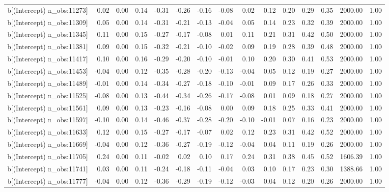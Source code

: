 \begin{table}[ht]
\begin{tabular}{rrrrrrrrrrrrrrr}
  b[(Intercept) n\_obs:11273] & 0.02 & 0.00 & 0.14 & -0.31 & -0.26 & -0.16 & -0.08 & 0.02 & 0.12 & 0.20 & 0.29 & 0.35 & 2000.00 & 1.00 \\ 
  b[(Intercept) n\_obs:11309] & 0.05 & 0.00 & 0.14 & -0.31 & -0.21 & -0.13 & -0.04 & 0.05 & 0.14 & 0.23 & 0.32 & 0.39 & 2000.00 & 1.00 \\ 
  b[(Intercept) n\_obs:11345] & 0.11 & 0.00 & 0.15 & -0.27 & -0.17 & -0.08 & 0.01 & 0.11 & 0.21 & 0.31 & 0.42 & 0.50 & 2000.00 & 1.00 \\ 
  b[(Intercept) n\_obs:11381] & 0.09 & 0.00 & 0.15 & -0.32 & -0.21 & -0.10 & -0.02 & 0.09 & 0.19 & 0.28 & 0.39 & 0.48 & 2000.00 & 1.00 \\ 
  b[(Intercept) n\_obs:11417] & 0.10 & 0.00 & 0.16 & -0.29 & -0.20 & -0.10 & -0.01 & 0.10 & 0.20 & 0.30 & 0.41 & 0.53 & 2000.00 & 1.00 \\ 
  b[(Intercept) n\_obs:11453] & -0.04 & 0.00 & 0.12 & -0.35 & -0.28 & -0.20 & -0.13 & -0.04 & 0.05 & 0.12 & 0.19 & 0.27 & 2000.00 & 1.00 \\ 
  b[(Intercept) n\_obs:11489] & -0.01 & 0.00 & 0.14 & -0.34 & -0.27 & -0.18 & -0.10 & -0.01 & 0.09 & 0.17 & 0.26 & 0.33 & 2000.00 & 1.00 \\ 
  b[(Intercept) n\_obs:11525] & -0.08 & 0.00 & 0.13 & -0.44 & -0.34 & -0.26 & -0.17 & -0.08 & 0.01 & 0.09 & 0.18 & 0.27 & 2000.00 & 1.00 \\ 
  b[(Intercept) n\_obs:11561] & 0.09 & 0.00 & 0.13 & -0.23 & -0.16 & -0.08 & 0.00 & 0.09 & 0.18 & 0.25 & 0.33 & 0.41 & 2000.00 & 1.00 \\ 
  b[(Intercept) n\_obs:11597] & -0.10 & 0.00 & 0.14 & -0.46 & -0.37 & -0.28 & -0.20 & -0.10 & -0.01 & 0.07 & 0.16 & 0.23 & 2000.00 & 1.00 \\ 
  b[(Intercept) n\_obs:11633] & 0.12 & 0.00 & 0.15 & -0.27 & -0.17 & -0.07 & 0.02 & 0.12 & 0.23 & 0.31 & 0.42 & 0.52 & 2000.00 & 1.00 \\ 
  b[(Intercept) n\_obs:11669] & -0.04 & 0.00 & 0.12 & -0.36 & -0.27 & -0.19 & -0.12 & -0.04 & 0.04 & 0.11 & 0.19 & 0.26 & 2000.00 & 1.00 \\ 
  b[(Intercept) n\_obs:11705] & 0.24 & 0.00 & 0.11 & -0.02 & 0.02 & 0.10 & 0.17 & 0.24 & 0.31 & 0.38 & 0.45 & 0.52 & 1606.39 & 1.00 \\ 
  b[(Intercept) n\_obs:11741] & 0.03 & 0.00 & 0.11 & -0.24 & -0.18 & -0.11 & -0.04 & 0.03 & 0.10 & 0.17 & 0.23 & 0.30 & 1388.66 & 1.00 \\ 
  b[(Intercept) n\_obs:11777] & -0.04 & 0.00 & 0.12 & -0.36 & -0.29 & -0.19 & -0.12 & -0.03 & 0.04 & 0.12 & 0.20 & 0.26 & 2000.00 & 1.00 \\ 

\end{tabular}
\end{table}
